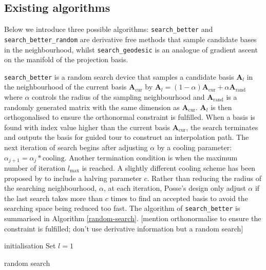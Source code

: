\documentclass[12pt]{article}
\begin{document}
\newpage

\hypertarget{existing-algorithms}{%
\subsection{Existing algorithms}\label{existing-algorithms}}

Below we introduce three possible algorithms: \texttt{search\_better}
and \texttt{search\_better\_random} are derivative free methods that
sample candidate bases in the neighbourhood, whilst
\texttt{search\_geodesic} is an analogue of gradient ascent on the
manifold of the projection basis.

\texttt{search\_better} is a random search device that samples a
candidate basis \(\mathbf{A}_{l}\) in the neighbourhood of the current
basis \(\mathbf{A}_{\text{cur}}\) by
\(\mathbf{A}_{l} = (1- \alpha)\mathbf{A}_{\text{cur}} + \alpha \mathbf{A}_{\text{rand}}\)
where \(\alpha\) controls the radius of the sampling neighbourhood and
\(\mathbf{A}_{\text{rand}}\) is a randomly generated matrix with the
same dimension as \(\mathbf{A}_{\text{cur}}\). \(\mathbf{A}_{l}\) is
then orthogonalised to ensure the orthonormal constraint is fulfilled.
When a basis is found with index value higher than the current basis
\(\mathbf{A}_{\text{cur}}\), the search terminates and outputs the basis
for guided tour to construct an interpolation path. The next iteration
of search begins after adjusting \(\alpha\) by a cooling parameter:
\(\alpha_{j+1} = \alpha_j * \text{cooling}\). Another termination
condition is when the maximum number of iteration \(l_{\max}\) is
reached. A slightly different cooling scheme has been proposed by
\citet{posse1995projection} to include a halving parameter \(c\). Rather
than reducing the radius of the searching neighbourhood, \(\alpha\), at
each iteration, Posse's design only adjust \(\alpha\) if the last search
takes more than \(c\) times to find an accepted basis to avoid the
searching space being reduced too fast. The algorithm of
\texttt{search\_better} is summarised in Algorithm \ref{random-search}.
{[}mention orthonormalise to ensure the constraint is fulfilled; don't
use derivative information but a random search{]}

\begin{algorithm}
\SetAlgoLined
  initialisation\;
  Set $l = 1$\;
  \caption{random search}
  \label{random-search}
\end{algorithm}
\end{document}
